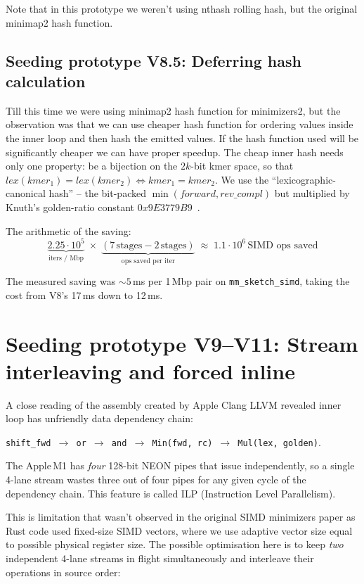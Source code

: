 Note that in this prototype we weren't using nthash rolling hash, but the original minimap2 hash function.

\subsection{Seeding prototype V8.5: Deferring hash calculation}
\label{sec:v8-defer-scramble}

Till this time we were using minimap2 hash function for minimizers2, but the observation was that we can use cheaper hash function for ordering values inside the inner loop and then hash the emitted values. If the hash function used will be significantly cheaper we can have proper speedup.
The cheap inner hash needs only one
property: be a bijection on the $2k$-bit kmer space, so that
$\textit{lex}(\textit{kmer}_1) = \textit{lex}(\textit{kmer}_2) \iff
\textit{kmer}_1 = \textit{kmer}_2$.  We use the
``lexicographic-canonical hash'' -- the bit-packed
$\min(\textit{forward}, \textit{rev\_compl})$ but multiplied
by Knuth's golden-ratio constant
$0x9E3779B9$~\cite{knuth_taocp_v3}.

The arithmetic of the saving:
\[
\underbrace{2.25 \cdot 10^5}_{\text{iters / Mbp}}
\;\times\;
\underbrace{(7\,\text{stages} - 2\,\text{stages})}_{\text{ops saved per iter}}
\;\approx\;
1.1 \cdot 10^6\,\text{SIMD ops saved}
\]

The measured saving was $\sim 5$\,ms per 1\,Mbp pair on
\texttt{mm\_sketch\_simd}, taking the cost from V8's 17\,ms down to
12\,ms.

\section{Seeding prototype V9--V11: Stream interleaving and forced inline}
\label{sec:v11-v12}

A close reading of the assembly created by Apple Clang LLVM revealed inner loop has unfriendly data dependency chain:
\begin{center}
  \texttt{shift\_fwd $\to$ or $\to$ and $\to$ Min(fwd, rc) $\to$ Mul(lex, golden)}.
\end{center}

The Apple\,M1 has \emph{four} 128-bit NEON
pipes that issue independently, so a single 4-lane stream wastes
three out of four pipes for any given cycle of the dependency
chain. This feature is called ILP (Instruction Level Parallelism).

This is limitation that wasn't observed in the original SIMD minimizers paper as Rust code used fixed-size SIMD vectors, where we use adaptive vector size equal to possible physical register size.
The possible optimisation here is to keep \emph{two} independent 4-lane streams in flight
simultaneously and interleave their operations in source order:

